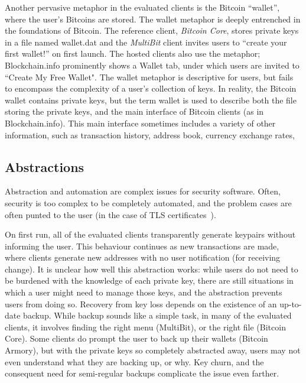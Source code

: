 Another pervasive metaphor in the evaluated clients is the Bitcoin ``wallet'', where the user's Bitcoins are stored. The wallet metaphor is deeply entrenched in the foundations of Bitcoin. The reference client, \emph{Bitcoin Core}, stores private keys in a file named wallet.dat and the \emph{MultiBit} client invites users to ``create your first wallet!'' on first launch. The hosted clients also use the metaphor; Blockchain.info prominently shows a Wallet tab, under which users are invited to ``Create My Free Wallet". The wallet metaphor is descriptive for users, but fails to encompass the complexity of a user's collection of keys. In reality, the Bitcoin wallet contains private keys, but the term wallet is used to describe both the file storing the private keys, and the main interface of Bitcoin clients (as in Blockchain.info). This main interface sometimes includes a variety of other information, such as transaction history, address book, currency exchange rates, \etc


\subsection{Abstractions}

Abstraction and automation are complex issues for security software. Often, security is too complex to be completely automated, and the problem cases are often punted to the user (\eg in the case of TLS certificates~\cite{SSLSobey}).  

On first run, all of the evaluated clients transparently generate keypairs without informing the user. This behaviour continues as new transactions are made, where clients generate new addresses with no user notification (\eg for receiving change). It is unclear how well this abstraction works: while users do not need to be burdened with the knowledge of each private key, there are still situations in which a user might need to manage those keys, and the abstraction prevents users from doing so. Recovery from key loss depends on the existence of an up-to-date backup. While backup sounds like a simple task, in many of the evaluated clients, it involves finding the right menu (MultiBit), or the right file (Bitcoin Core). Some clients do prompt the user to back up their wallets (\eg Bitcoin Armory), but with the private keys so completely abstracted away, users may not even understand what they are backing up, or why. Key churn, and the consequent need for semi-regular backups complicate the issue even farther. %

